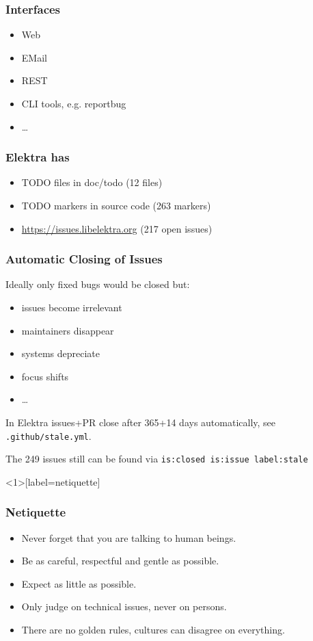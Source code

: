 \begin{frame}
	\frametitle{Interfaces}

	\begin{itemize}
		\item Web
		\item EMail
		\item REST
		\item CLI tools, e.g. reportbug
		\item \dots
	\end{itemize}
\end{frame}

\begin{frame}
	\frametitle{Elektra has}
	\begin{itemize}
		\item TODO files in doc/todo (12 files)
		\item TODO markers in source code (263 markers)
		\item \url{https://issues.libelektra.org} (217 open issues)
	\end{itemize}
\end{frame}

\begin{frame}[fragile]
	\frametitle{Automatic Closing of Issues}

	Ideally only fixed bugs would be closed but:
	\begin{itemize}
		\item issues become irrelevant
		\item maintainers disappear
		\item systems depreciate
		\item focus shifts
		\item \dots
	\end{itemize}
	\vspace{1cm}

	In Elektra issues+PR close after 365+14 days automatically, see
	\verb+.github/stale.yml+.

	\vspace{1cm}
	The 249 issues still can be found via \verb+is:closed is:issue label:stale+
\end{frame}

\begin{frame}<1>[label=netiquette]
	\frametitle{Netiquette}

	\begin{itemize}
		\item Never forget that you are talking to human beings.
		\item Be as careful, respectful and gentle as possible.
		\item Expect as little as possible.
		\item Only judge on technical issues, never on persons.
		\item There are no golden rules, cultures can disagree on everything.
	\end{itemize}

\end{frame}

